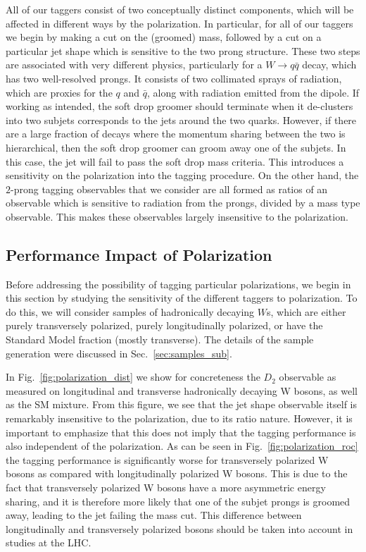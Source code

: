 \documentclass[11pt,letterpaper]{article}
\DeclareRobustCommand{\Sec}[1]{Sec.~\ref{#1}}
\DeclareRobustCommand{\Fig}[1]{Fig.~\ref{#1}}
\begin{document}
All of our taggers consist of two conceptually distinct components, which will be affected in different ways by the polarization.
%
In particular, for all of our taggers we begin by making a cut on the (groomed) mass, followed by a cut on a particular jet shape which is sensitive to the two prong structure. These two steps are associated with very different physics, particularly for a $W\to q\bar q$ decay, which has two well-resolved prongs.
%
It consists of two collimated sprays of radiation, which are proxies for the $q$ and $\bar q$, along with radiation emitted from the dipole.
%
If working as intended, the soft drop groomer should terminate when it de-clusters into two subjets corresponds to the jets around the two quarks.
%
However, if there are a large fraction of decays where the momentum sharing between the two is hierarchical, then the soft drop groomer can groom away one of the subjets.
%
In this case, the jet will fail to pass the soft drop mass criteria.
%
This introduces a sensitivity on the polarization into the tagging procedure.
%
On the other hand, the $2$-prong tagging observables that we consider are all formed as ratios of an observable which is sensitive to radiation from the prongs, divided by a mass type observable.
%
This makes these observables largely insensitive to the polarization.

\subsection{Performance Impact of Polarization}\label{sec:polar_robust}


Before addressing the possibility of tagging particular polarizations, we begin in this section by studying the sensitivity of the different taggers to polarization. To do this, we will consider samples of hadronically decaying $W$s, which are either purely transversely polarized, purely longitudinally polarized, or have the Standard Model fraction (mostly transverse). The details of the sample generation were discussed in \Sec{sec:samples_sub}.

In \Fig{fig:polarization_dist} we show for concreteness the $D_2$ observable as measured on longitudinal and transverse hadronically decaying W bosons, as well as the SM mixture. From this figure, we see that the jet shape observable itself is remarkably insensitive to the polarization, due to its ratio nature. However, it is important to emphasize that this does not imply that the tagging performance is also independent of the polarization. As can be seen in \Fig{fig:polarization_roc} the tagging performance is significantly worse for transversely polarized W bosons as compared with longitudinally polarized W bosons. This is due to the fact that transversely polarized W bosons have a more asymmetric energy sharing, and it is therefore more likely that one of the subjet prongs is groomed away, leading to the jet failing the mass cut. This difference between longitudinally and transversely polarized bosons should be taken into account in studies at the LHC.
\end{document}
